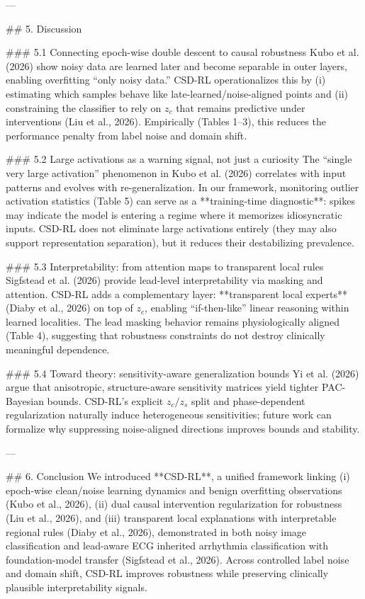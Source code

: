 ---

## 5. Discussion  

### 5.1 Connecting epoch-wise double descent to causal robustness  
Kubo et al. (2026) show noisy data are learned later and become separable in outer layers, enabling overfitting “only noisy data.” CSD-RL operationalizes this by (i) estimating which samples behave like late-learned/noise-aligned points and (ii) constraining the classifier to rely on \(z_c\) that remains predictive under interventions (Liu et al., 2026). Empirically (Tables 1–3), this reduces the performance penalty from label noise and domain shift.

### 5.2 Large activations as a warning signal, not just a curiosity  
The “single very large activation” phenomenon in Kubo et al. (2026) correlates with input patterns and evolves with re-generalization. In our framework, monitoring outlier activation statistics (Table 5) can serve as a **training-time diagnostic**: spikes may indicate the model is entering a regime where it memorizes idiosyncratic inputs. CSD-RL does not eliminate large activations entirely (they may also support representation separation), but it reduces their destabilizing prevalence.

### 5.3 Interpretability: from attention maps to transparent local rules  
Sigfstead et al. (2026) provide lead-level interpretability via masking and attention. CSD-RL adds a complementary layer: **transparent local experts** (Diaby et al., 2026) on top of \(z_c\), enabling “if-then-like” linear reasoning within learned localities. The lead masking behavior remains physiologically aligned (Table 4), suggesting that robustness constraints do not destroy clinically meaningful dependence.

### 5.4 Toward theory: sensitivity-aware generalization bounds  
Yi et al. (2026) argue that anisotropic, structure-aware sensitivity matrices yield tighter PAC-Bayesian bounds. CSD-RL’s explicit \(z_c/z_s\) split and phase-dependent regularization naturally induce heterogeneous sensitivities; future work can formalize why suppressing noise-aligned directions improves bounds and stability.

---

## 6. Conclusion  
We introduced **CSD-RL**, a unified framework linking (i) epoch-wise clean/noise learning dynamics and benign overfitting observations (Kubo et al., 2026), (ii) dual causal intervention regularization for robustness (Liu et al., 2026), and (iii) transparent local explanations with interpretable regional rules (Diaby et al., 2026), demonstrated in both noisy image classification and lead-aware ECG inherited arrhythmia classification with foundation-model transfer (Sigfstead et al., 2026). Across controlled label noise and domain shift, CSD-RL improves robustness while preserving clinically plausible interpretability signals.

